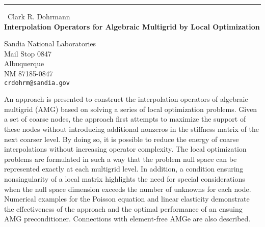 \documentclass{report}
\begin{document}
\begin{center}
\rule{6in}{1pt} \
{\large Clark R. Dohrmann \\
{\bf Interpolation Operators for Algebraic Multigrid by Local Optimization}}

Sandia National Laboratories \\ Mail Stop 0847 \\ Albuquerque \\ NM 87185-0847
\\
{\tt crdohrm@sandia.gov}\end{center}

An approach is presented to construct the interpolation operators of
algebraic multigrid (AMG) based on solving a series of local optimization
problems. Given a set of coarse nodes, the approach first attempts to
maximize the support of these nodes without introducing additional
nonzeros in the stiffness matrix of the next coarser level. By doing so,
it is possible to reduce the energy of coarse interpolations without
increasing operator complexity. The local optimization problems are
formulated in such a way that the problem null space can be represented
exactly at each multigrid level. In addition, a condition ensuring
nonsingularity of a local matrix highlights the need for special
considerations when the null space dimension exceeds the number of
unknowns for each node. Numerical examples for the Poisson equation and
linear elasticity demonstrate the effectiveness of the approach and the
optimal performance of an ensuing AMG preconditioner. Connections with
element-free AMGe are also described.
\end{document}
